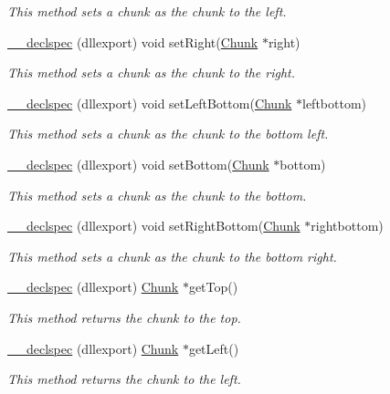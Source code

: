\begin{DoxyCompactItemize}
\begin{DoxyCompactList}\small\item\em This method sets a chunk as the chunk to the left. \end{DoxyCompactList}\item 
\hyperlink{class_chunk_ac390d85879176e6e8a26667ba97f8eee}{\-\_\-\-\_\-declspec} (dllexport) void set\-Right(\hyperlink{class_chunk}{Chunk} $\ast$right)
\begin{DoxyCompactList}\small\item\em This method sets a chunk as the chunk to the right. \end{DoxyCompactList}\item 
\hyperlink{class_chunk_a5f6e70225dcd2d5f2cf0c3f77abdfa4b}{\-\_\-\-\_\-declspec} (dllexport) void set\-Left\-Bottom(\hyperlink{class_chunk}{Chunk} $\ast$leftbottom)
\begin{DoxyCompactList}\small\item\em This method sets a chunk as the chunk to the bottom left. \end{DoxyCompactList}\item 
\hyperlink{class_chunk_a69ed23533460c9308dc6ae6e92143e65}{\-\_\-\-\_\-declspec} (dllexport) void set\-Bottom(\hyperlink{class_chunk}{Chunk} $\ast$bottom)
\begin{DoxyCompactList}\small\item\em This method sets a chunk as the chunk to the bottom. \end{DoxyCompactList}\item 
\hyperlink{class_chunk_a42b5a5cf3a22b7cdd14e5e16f9c74ed0}{\-\_\-\-\_\-declspec} (dllexport) void set\-Right\-Bottom(\hyperlink{class_chunk}{Chunk} $\ast$rightbottom)
\begin{DoxyCompactList}\small\item\em This method sets a chunk as the chunk to the bottom right. \end{DoxyCompactList}\item 
\hyperlink{class_chunk_a023a2a543fc48c2b9ba5d2e31eb42e2a}{\-\_\-\-\_\-declspec} (dllexport) \hyperlink{class_chunk}{Chunk} $\ast$get\-Top()
\begin{DoxyCompactList}\small\item\em This method returns the chunk to the top. \end{DoxyCompactList}\item 
\hyperlink{class_chunk_a9b1f0c64473950040eff7ac832ae07f7}{\-\_\-\-\_\-declspec} (dllexport) \hyperlink{class_chunk}{Chunk} $\ast$get\-Left()
\begin{DoxyCompactList}\small\item\em This method returns the chunk to the left. \end{DoxyCompactList}\item 

\end{DoxyCompactItemize}
